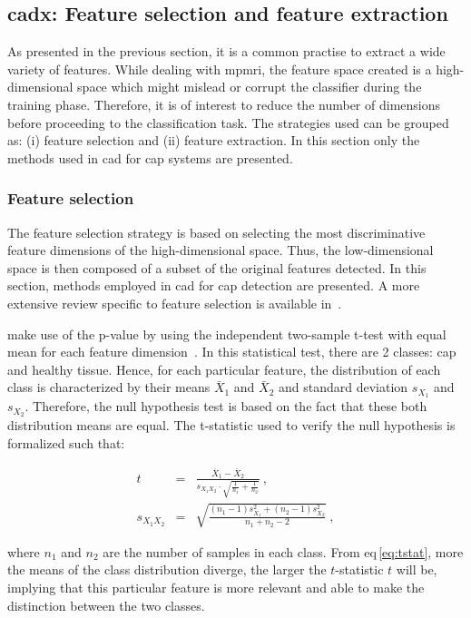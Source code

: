 \subsection{\acs*{cadx}: Feature selection and feature extraction} \label{subsec:chp3:img-clas:CADX-fea-ext}
As presented in the previous section, it is a common practise to extract a wide
variety of features.
While dealing with \ac{mpmri}, the feature space created is a high-dimensional
space which might mislead or corrupt the classifier during the training phase.
Therefore, it is of interest to reduce the number of dimensions before
proceeding to the classification task.
The strategies used can be grouped as: (i) feature selection and (ii) feature
extraction.
In this section only the methods used in \ac{cad} for \ac{cap} systems are
presented.

\subsubsection{Feature selection}\label{subsubsec:chp3:img-clas:CADX:fea-ext:sel}
The feature selection strategy is based on selecting the most discriminative
feature dimensions of the high-dimensional space.
Thus, the low-dimensional space is then composed of a subset of the original
features detected.
In this section, methods employed in \ac{cad} for \ac{cap} detection are
presented.
A more extensive review specific to feature selection is available
in~\cite{Saeys2007}.

\citeauthor{Niaf2012} make use of the p-value by using the independent
two-sample t-test with equal mean for each feature
dimension~\cite{Niaf2011,Niaf2012}.
In this statistical test, there are 2 classes: \ac{cap} and healthy tissue.
Hence, for each particular feature, the distribution of each class is
characterized by their means $\bar{X}_1$ and $\bar{X}_2$ and standard deviation
$s_{X_1}$ and $s_{X_2}$.
Therefore, the null hypothesis test is based on the fact that these both
distribution means are equal.
The t-statistic used to verify the null hypothesis is formalized such that:

\begin{eqnarray}
  t & = & \frac{\bar {X}_1 - \bar{X}_2}{s_{X_1X_2} \cdot \sqrt{\frac{1}{n_1}+\frac{1}{n_2}}} \ , \label{eq:tstat} \\
  s_{X_1X_2} & = & \sqrt{\frac{(n_1-1)s_{X_1}^2+(n_2-1)s_{X_2}^2}{n_1+n_2-2}} \ , \nonumber
\end{eqnarray}

\noindent where $n_1$ and $n_2$ are the number of samples in each class.
From \acs{eq}\,\eqref{eq:tstat}, more the means of the class distribution
diverge, the larger the $t$-statistic $t$ will be, implying that this
particular feature is more relevant and able to make the distinction between
the two classes.

